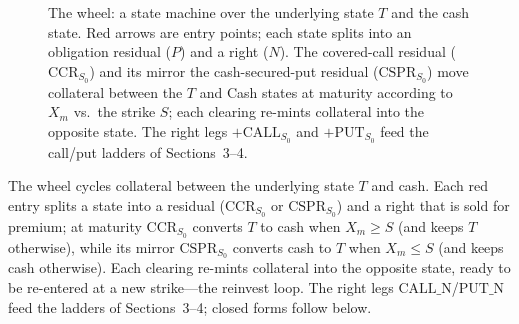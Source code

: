 \documentclass[11pt]{article}
\newcommand{\CCR}{\mathrm{CCR}_{S_0}}
\newcommand{\CSPR}{\mathrm{CSPR}_{S_0}}
\newcommand{\CN}{\mathrm{CALL\_N}}
\newcommand{\PN}{\mathrm{PUT\_N}}
\begin{document}
\begin{figure}[H]
{%
}
\caption{The wheel: a state machine over the underlying state $T$ and the cash state.
Red arrows are entry points; each state splits into an obligation residual ($P$) and a
right ($N$). The covered-call residual ($\CCR$) and its mirror the cash-secured-put
residual ($\CSPR$) move collateral between the $T$ and Cash states at maturity according
to $X_m$ vs.\ the strike $S$; each clearing re-mints collateral into the opposite state.
The right legs $+\mathrm{CALL}_{S_0}$ and $+\mathrm{PUT}_{S_0}$ feed the call/put ladders
of Sections~3--4.}
\label{fig:ladder}
\end{figure}

The wheel cycles collateral between the underlying state $T$ and cash. Each red entry
splits a state into a residual ($\CCR$ or $\CSPR$) and a right that is sold for premium; at
maturity $\CCR$ converts $T$ to cash when $X_m\ge S$ (and keeps $T$ otherwise), while its
mirror $\CSPR$ converts cash to $T$ when $X_m\le S$ (and keeps cash otherwise). Each
clearing re-mints collateral into the opposite state, ready to be re-entered at a new
strike---the reinvest loop. The right legs $\CN$/$\PN$ feed the ladders of Sections~3--4;
closed forms follow below.
\end{document}

